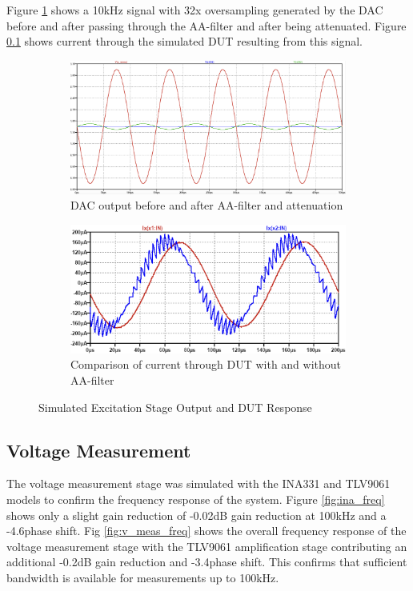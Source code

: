 Figure \ref{fig:dac_filtering} shows a 10kHz signal with 32x oversampling generated by the DAC before and after passing through the AA-filter and after being attenuated. Figure \ref{} shows current through the simulated DUT resulting from this signal.

\begin{figure}[H]
    \centering
    \begin{subfigure}[b]{0.48\textwidth}
        \centering
        \includegraphics[width=\textwidth]{ExcitationStage.png}
        \caption{DAC output before and after AA-filter and attenuation}
        \label{fig:dac_filtering}
    \end{subfigure}\hfill
    \begin{subfigure}[b]{0.48\textwidth}
        \centering
        \includegraphics[width=\textwidth]{AA_vs_noAA_cur.png}
        \caption{Comparison of current through DUT with and without AA-filter}
        \label{fig:dut_current}
    \end{subfigure}
    \caption{Simulated Excitation Stage Output and DUT Response}
    \label{fig:excitation_sim}
\end{figure}

\subsection{Voltage Measurement}
The voltage measurement stage was simulated with the INA331 and TLV9061 models to confirm the frequency response of the system. Figure \ref{fig:ina_freq} shows only a slight gain reduction of -0.02dB gain reduction at 100kHz and a -4.6\textdegree phase shift. Fig \ref{fig:v_meas_freq} shows the overall frequency response of the voltage measurement stage with the TLV9061 amplification stage contributing an additional -0.2dB gain reduction and -3.4\textdegree phase shift. This confirms that sufficient bandwidth is available for measurements up to 100kHz.

